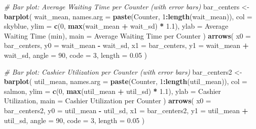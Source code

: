 \documentclass[
]{article}
\newenvironment{Shaded}{\begin{snugshade}}{\end{snugshade}}
\newcommand{\AttributeTok}[1]{\textcolor[rgb]{0.13,0.29,0.53}{#1}}
\newcommand{\CommentTok}[1]{\textcolor[rgb]{0.56,0.35,0.01}{\textit{#1}}}
\newcommand{\DecValTok}[1]{\textcolor[rgb]{0.00,0.00,0.81}{#1}}
\newcommand{\FloatTok}[1]{\textcolor[rgb]{0.00,0.00,0.81}{#1}}
\newcommand{\FunctionTok}[1]{\textcolor[rgb]{0.13,0.29,0.53}{\textbf{#1}}}
\newcommand{\NormalTok}[1]{#1}
\newcommand{\OtherTok}[1]{\textcolor[rgb]{0.56,0.35,0.01}{#1}}
\newcommand{\SpecialCharTok}[1]{\textcolor[rgb]{0.81,0.36,0.00}{\textbf{#1}}}
\newcommand{\StringTok}[1]{\textcolor[rgb]{0.31,0.60,0.02}{#1}}
\begin{document}
\begin{Shaded}
\begin{Highlighting}[]
\CommentTok{\# Bar plot: Average Waiting Time per Counter (with error bars)}
\NormalTok{bar\_centers }\OtherTok{\textless{}{-}} \FunctionTok{barplot}\NormalTok{(}
\NormalTok{  wait\_mean,}
  \AttributeTok{names.arg =} \FunctionTok{paste}\NormalTok{(}\StringTok{\textquotesingle{}Counter\textquotesingle{}}\NormalTok{, }\DecValTok{1}\SpecialCharTok{:}\FunctionTok{length}\NormalTok{(wait\_mean)),}
  \AttributeTok{col =} \StringTok{\textquotesingle{}skyblue\textquotesingle{}}\NormalTok{,}
  \AttributeTok{ylim =} \FunctionTok{c}\NormalTok{(}\DecValTok{0}\NormalTok{, }\FunctionTok{max}\NormalTok{(wait\_mean }\SpecialCharTok{+}\NormalTok{ wait\_sd) }\SpecialCharTok{*} \FloatTok{1.1}\NormalTok{),}
  \AttributeTok{ylab =} \StringTok{\textquotesingle{}Average Waiting Time (min)\textquotesingle{}}\NormalTok{,}
  \AttributeTok{main =} \StringTok{\textquotesingle{}Average Waiting Time per Counter\textquotesingle{}}
\NormalTok{)}
\FunctionTok{arrows}\NormalTok{(}
  \AttributeTok{x0 =}\NormalTok{ bar\_centers,}
  \AttributeTok{y0 =}\NormalTok{ wait\_mean }\SpecialCharTok{{-}}\NormalTok{ wait\_sd,}
  \AttributeTok{x1 =}\NormalTok{ bar\_centers,}
  \AttributeTok{y1 =}\NormalTok{ wait\_mean }\SpecialCharTok{+}\NormalTok{ wait\_sd,}
  \AttributeTok{angle =} \DecValTok{90}\NormalTok{, }\AttributeTok{code =} \DecValTok{3}\NormalTok{, }\AttributeTok{length =} \FloatTok{0.05}
\NormalTok{)}

\CommentTok{\# Bar plot: Cashier Utilization per Counter (with error bars)}
\NormalTok{bar\_centers2 }\OtherTok{\textless{}{-}} \FunctionTok{barplot}\NormalTok{(}
\NormalTok{  util\_mean,}
  \AttributeTok{names.arg =} \FunctionTok{paste}\NormalTok{(}\StringTok{\textquotesingle{}Counter\textquotesingle{}}\NormalTok{, }\DecValTok{1}\SpecialCharTok{:}\FunctionTok{length}\NormalTok{(util\_mean)),}
  \AttributeTok{col =} \StringTok{\textquotesingle{}salmon\textquotesingle{}}\NormalTok{,}
  \AttributeTok{ylim =} \FunctionTok{c}\NormalTok{(}\DecValTok{0}\NormalTok{, }\FunctionTok{max}\NormalTok{(util\_mean }\SpecialCharTok{+}\NormalTok{ util\_sd) }\SpecialCharTok{*} \FloatTok{1.1}\NormalTok{),}
  \AttributeTok{ylab =} \StringTok{\textquotesingle{}Cashier Utilization\textquotesingle{}}\NormalTok{,}
  \AttributeTok{main =} \StringTok{\textquotesingle{}Cashier Utilization per Counter\textquotesingle{}}
\NormalTok{)}
\FunctionTok{arrows}\NormalTok{(}
  \AttributeTok{x0 =}\NormalTok{ bar\_centers2,}
  \AttributeTok{y0 =}\NormalTok{ util\_mean }\SpecialCharTok{{-}}\NormalTok{ util\_sd,}
  \AttributeTok{x1 =}\NormalTok{ bar\_centers2,}
  \AttributeTok{y1 =}\NormalTok{ util\_mean }\SpecialCharTok{+}\NormalTok{ util\_sd,}
  \AttributeTok{angle =} \DecValTok{90}\NormalTok{, }\AttributeTok{code =} \DecValTok{3}\NormalTok{, }\AttributeTok{length =} \FloatTok{0.05}
\NormalTok{)}




\end{Highlighting}
\end{Shaded}
\end{document}
